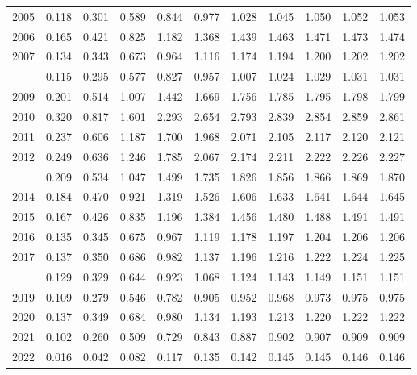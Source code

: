\documentclass[
]{article}
\begin{document}
\begin{longtable}[t]{lrrrrrrrrrr}
2005 & 0.118 & 0.301 & 0.589 & 0.844 & 0.977 & 1.028 & 1.045 & 1.050 & 1.052 & 1.053\\
2006 & 0.165 & 0.421 & 0.825 & 1.182 & 1.368 & 1.439 & 1.463 & 1.471 & 1.473 & 1.474\\
2007 & 0.134 & 0.343 & 0.673 & 0.964 & 1.116 & 1.174 & 1.194 & 1.200 & 1.202 & 1.202\\
\addlinespace
2008 & 0.115 & 0.295 & 0.577 & 0.827 & 0.957 & 1.007 & 1.024 & 1.029 & 1.031 & 1.031\\
2009 & 0.201 & 0.514 & 1.007 & 1.442 & 1.669 & 1.756 & 1.785 & 1.795 & 1.798 & 1.799\\
2010 & 0.320 & 0.817 & 1.601 & 2.293 & 2.654 & 2.793 & 2.839 & 2.854 & 2.859 & 2.861\\
2011 & 0.237 & 0.606 & 1.187 & 1.700 & 1.968 & 2.071 & 2.105 & 2.117 & 2.120 & 2.121\\
2012 & 0.249 & 0.636 & 1.246 & 1.785 & 2.067 & 2.174 & 2.211 & 2.222 & 2.226 & 2.227\\
\addlinespace
2013 & 0.209 & 0.534 & 1.047 & 1.499 & 1.735 & 1.826 & 1.856 & 1.866 & 1.869 & 1.870\\
2014 & 0.184 & 0.470 & 0.921 & 1.319 & 1.526 & 1.606 & 1.633 & 1.641 & 1.644 & 1.645\\
2015 & 0.167 & 0.426 & 0.835 & 1.196 & 1.384 & 1.456 & 1.480 & 1.488 & 1.491 & 1.491\\
2016 & 0.135 & 0.345 & 0.675 & 0.967 & 1.119 & 1.178 & 1.197 & 1.204 & 1.206 & 1.206\\
2017 & 0.137 & 0.350 & 0.686 & 0.982 & 1.137 & 1.196 & 1.216 & 1.222 & 1.224 & 1.225\\
\addlinespace
2018 & 0.129 & 0.329 & 0.644 & 0.923 & 1.068 & 1.124 & 1.143 & 1.149 & 1.151 & 1.151\\
2019 & 0.109 & 0.279 & 0.546 & 0.782 & 0.905 & 0.952 & 0.968 & 0.973 & 0.975 & 0.975\\
2020 & 0.137 & 0.349 & 0.684 & 0.980 & 1.134 & 1.193 & 1.213 & 1.220 & 1.222 & 1.222\\
2021 & 0.102 & 0.260 & 0.509 & 0.729 & 0.843 & 0.887 & 0.902 & 0.907 & 0.909 & 0.909\\
2022 & 0.016 & 0.042 & 0.082 & 0.117 & 0.135 & 0.142 & 0.145 & 0.145 & 0.146 & 0.146\\*
\end{longtable}
\end{document}
